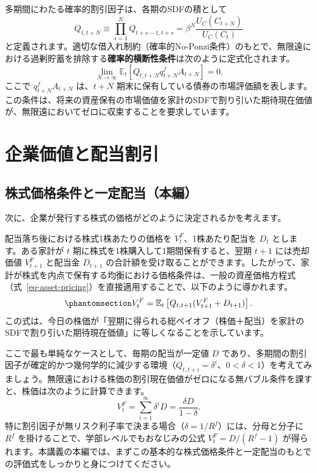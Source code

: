 \documentclass[
  japanese,
  lualatex,
  ja=standard,
  12pt,
  a4paper]{ltjsarticle}
\begin{document}
多期間にわたる確率的割引因子は、各期のSDFの積として \[
Q_{t,t+N} \equiv \prod_{s=1}^{N} Q_{t+s-1, t+s} = \beta^N \frac{U_C(C_{t+N})}{U_C(C_t)}
\]
と定義されます。適切な借入れ制約（確率的No-Ponzi条件）のもとで、無限遠における過剰貯蓄を排除する\textbf{確率的横断性条件}は次のように定式化されます。
\[
\lim_{N\to\infty} \mathbb{E}_t \left[ Q_{t,t+N} q_{t+N}^f A_{t+N} \right] = 0.
\] ここで \(q_{t+N}^f A_{t+N}\) は、\(t+N\)
期末に保有している債券の市場評価額を表します。この条件は、将来の資産保有の市場価値を家計のSDFで割り引いた期待現在価値が、無限遠においてゼロに収束することを要求しています。

\section{企業価値と配当割引}\label{ux4f01ux696dux4fa1ux5024ux3068ux914dux5f53ux5272ux5f15}

\subsection{株式価格条件と一定配当（本編）}\label{sec-equity-core}

次に、企業が発行する株式の価格がどのように決定されるかを考えます。

配当落ち後における株式1株あたりの価格を \(V_t^F\)、1株あたり配当を
\(D_t\) とします。ある家計が \(t\)
期に株式を1株購入して1期間保有すると、翌期 \(t+1\) には売却価値
\(V_{t+1}^F\) と配当金 \(D_{t+1}\)
の合計額を受け取ることができます。したがって、家計が株式を内点で保有する均衡における価格条件は、一般の資産価格方程式（式~\ref{eq-asset-pricing}）を直接適用することで、以下のように導かれます。
\begin{equation}\protect\phantomsection\label{eq-equity-value}{
V_t^F = \mathbb{E}_t \left[ Q_{t,t+1} (V_{t+1}^F + D_{t+1}) \right].
}\end{equation}
この式は、今日の株価が「翌期に得られる総ペイオフ（株価＋配当）を家計のSDFで割り引いた期待現在価値」に等しくなることを示しています。

ここで最も単純なケースとして、毎期の配当が一定値 \(D\)
であり、多期間の割引因子が確定的かつ幾何学的に減少する環境（\(Q_{t,t+i} = \delta^i\)、\(0<\delta<1\)）を考えてみましょう。無限遠における株価の割引現在価値がゼロになる無バブル条件を課すと、株価は次のように計算できます。
\[
V_t^F = \sum_{i=1}^{\infty} \delta^i D = \frac{\delta D}{1-\delta}.
\]
特に割引因子が無リスク利子率で決まる場合（\(\delta = 1/R^f\)）には、分母と分子に
\(R^f\) を掛けることで、学部レベルでもおなじみの公式
\(V_t^F = D / (R^f - 1)\)
が得られます。本講義の本編では、まずこの基本的な株式価格条件と一定配当のもとでの評価式をしっかりと身につけてください。
\end{document}
